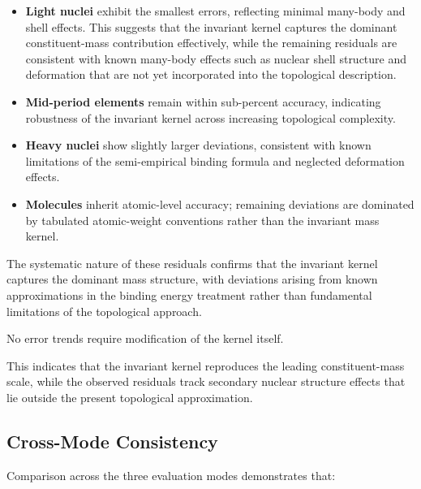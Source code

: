 \documentclass[11pt,a4paper]{article}
\begin{document}
            \begin{itemize}
                \item \textbf{Light nuclei} exhibit the smallest errors, reflecting minimal
                many-body and shell effects.
                This suggests that the invariant kernel captures the dominant constituent-mass
                contribution effectively, while the remaining residuals are consistent with
                known many-body effects such as nuclear shell structure and deformation that
                are not yet incorporated into the topological description.

                \item \textbf{Mid-period elements} remain within sub-percent accuracy,
                indicating robustness of the invariant kernel across increasing
                topological complexity.

                \item \textbf{Heavy nuclei} show slightly larger deviations, consistent
                with known limitations of the semi-empirical binding formula and
                neglected deformation effects.

                \item \textbf{Molecules} inherit atomic-level accuracy; remaining
                deviations are dominated by tabulated atomic-weight conventions rather
                than the invariant mass kernel.
            \end{itemize}

            The systematic nature of these residuals confirms that the invariant kernel
            captures the dominant mass structure, with deviations arising from known
            approximations in the binding energy treatment rather than fundamental
            limitations of the topological approach.

            No error trends require modification of the kernel itself.

            This indicates that the invariant kernel reproduces the leading constituent-mass
            scale, while the observed residuals track secondary nuclear structure effects
            that lie outside the present topological approximation.


    \subsection{Cross-Mode Consistency}

            Comparison across the three evaluation modes demonstrates that:
\end{document}

